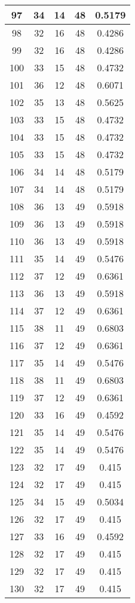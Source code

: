 \documentclass[letterpaper, 12pt]{article}
\begin{document}
\begin{longtable}{|c|c|c|c|c|}
\hline
97 & 34 & 14 & 48 & 0.5179 \\
\hline
98 & 32 & 16 & 48 & 0.4286 \\
\hline
99 & 32 & 16 & 48 & 0.4286 \\
\hline
100 & 33 & 15 & 48 & 0.4732 \\
\hline
101 & 36 & 12 & 48 & 0.6071 \\
\hline
102 & 35 & 13 & 48 & 0.5625 \\
\hline
103 & 33 & 15 & 48 & 0.4732 \\
\hline
104 & 33 & 15 & 48 & 0.4732 \\
\hline
105 & 33 & 15 & 48 & 0.4732 \\
\hline
106 & 34 & 14 & 48 & 0.5179 \\
\hline
107 & 34 & 14 & 48 & 0.5179 \\
\hline
108 & 36 & 13 & 49 & 0.5918 \\
\hline
109 & 36 & 13 & 49 & 0.5918 \\
\hline
110 & 36 & 13 & 49 & 0.5918 \\
\hline
111 & 35 & 14 & 49 & 0.5476 \\
\hline
112 & 37 & 12 & 49 & 0.6361 \\
\hline
113 & 36 & 13 & 49 & 0.5918 \\
\hline
114 & 37 & 12 & 49 & 0.6361 \\
\hline
115 & 38 & 11 & 49 & 0.6803 \\
\hline
116 & 37 & 12 & 49 & 0.6361 \\
\hline
117 & 35 & 14 & 49 & 0.5476 \\
\hline
118 & 38 & 11 & 49 & 0.6803 \\
\hline
119 & 37 & 12 & 49 & 0.6361 \\
\hline
120 & 33 & 16 & 49 & 0.4592 \\
\hline
121 & 35 & 14 & 49 & 0.5476 \\
\hline
122 & 35 & 14 & 49 & 0.5476 \\
\hline
123 & 32 & 17 & 49 & 0.415 \\
\hline
124 & 32 & 17 & 49 & 0.415 \\
\hline
125 & 34 & 15 & 49 & 0.5034 \\
\hline
126 & 32 & 17 & 49 & 0.415 \\
\hline
127 & 33 & 16 & 49 & 0.4592 \\
\hline
128 & 32 & 17 & 49 & 0.415 \\
\hline
129 & 32 & 17 & 49 & 0.415 \\
\hline
130 & 32 & 17 & 49 & 0.415 \\

\end{longtable}
\end{document}
